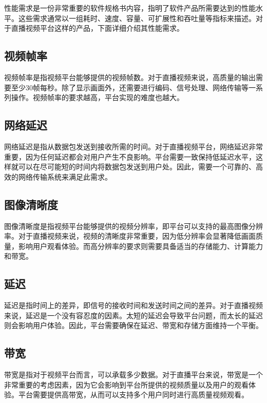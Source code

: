     性能需求是一份非常重要的软件规格书内容，指明了软件产品所需要达到的性能水平。这些需求通常以一组耗时、速度、容量、可扩展性和吞吐量等指标来描述。对于直播视频平台这样的产品，下面详细介绍其性能需求。
    
    \subsection{视频帧率}
    
    视频帧率是指视频平台能够提供的视频帧数。对于直播视频来说，高质量的输出需要至少30帧每秒。除了显示画面外，还需要进行编码、信号处理、网络传输等一系列操作。视频帧率的要求越高，平台实现的难度也越大。
    
    \subsection{网络延迟}
    
    网络延迟是指从数据包发送到接收所需的时间。对于直播视频平台，网络延迟非常重要，因为任何延迟都会对用户产生不良影响。平台需要一致保持低延迟水平，这样就可以在尽可能短的时间内将数据包发送到用户处。因此，需要一个可靠的、高效的网络传输系统来满足此需求。
    
    \subsection{图像清晰度}
    
    图像清晰度是指视频平台能够提供的视频分辨率，即平台可以支持的最高图像分辨率。对于直播视频来说，视频的清晰度非常重要，因为低分辨率会显著降低画面质量，影响用户观看体验。而高分辨率的要求则需要具备适当的存储能力、计算能力和带宽。
    
    \subsection{延迟}
    
    延迟是指时间上的差异，即信号的接收时间和发送时间之间的差异。对于直播视频来说，延迟是一个没有容忍度的因素。太短的延迟会导致平台问题，而太长的延迟则会影响用户体验。因此，平台需要确保在延迟、带宽和存储方面维持一个平衡。
    
    \subsection{带宽}
    
    带宽是指对于视频平台而言，可以承载多少数据。对于直播平台来说，带宽是一个非常重要的考虑因素，因为它会影响到平台所提供的视频质量以及用户的观看体验。平台需要提供高带宽，从而可以支持多个用户同时进行高质量视频观看。
    
